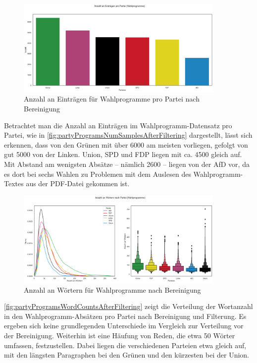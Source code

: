 \begin{figure}[H]
    \centering
    \includegraphics[width=0.9\textwidth]{data/images/party_programs/party_programs_num_samples_after_filter.png}
    \caption{Anzahl an Einträgen für Wahlprogramme pro Partei nach Bereinigung} \label{fig:partyProgramsNumSamplesAfterFiltering}
\end{figure}

Betrachtet man die Anzahl an Einträgen im Wahlprogramm-Datensatz pro Partei, wie in \autoref{fig:partyProgramsNumSamplesAfterFiltering} dargestellt, lässt sich erkennen, dass von den Grünen mit über \num{6000} am meisten vorliegen, gefolgt von gut \num{5000} von der Linken. Union, \ac{SPD} und \ac{FDP} liegen mit ca. \num{4500} gleich auf. Mit Abstand am wenigsten Absätze -- nämlich \num{2600} -- liegen von der \ac{AfD} vor, da es dort bei sechs Wahlen zu Problemen mit dem Auslesen des Wahlprogramm-Textes aus der \ac{PDF}-Datei gekommen ist.

\begin{figure}[H]
    \centering
    \includegraphics[width=0.9\textwidth]{data/images/party_programs/party_programs_word_count_after_filter.png}
    \caption{Anzahl an Wörtern für Wahlprogramme nach Bereinigung} \label{fig:partyProgramsWordCountsAfterFiltering}
\end{figure}

\autoref{fig:partyProgramsWordCountsAfterFiltering} zeigt die Verteilung der Wortanzahl in den Wahlprogramm-Absätzen pro Partei nach Bereinigung und Filterung. Es ergeben sich keine grundlegenden Unterschiede im Vergleich zur Verteilung vor der Bereinigung. Weiterhin ist eine Häufung von Reden, die etwa \num{50} Wörter umfassen, festzustellen. Dabei liegen die verschiedenen Parteien etwa gleich auf, mit den längsten Paragraphen bei den Grünen und den kürzesten bei der Union.

